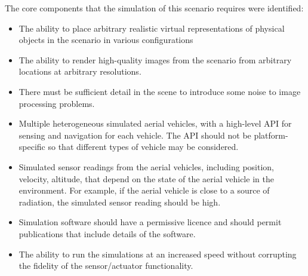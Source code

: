 The core components that the simulation of this scenario requires were identified: 
\begin{itemize}
    \item The ability to place arbitrary realistic virtual representations of physical objects in the scenario in various configurations
    \item The ability to render high-quality images from the scenario from arbitrary locations at arbitrary resolutions.
    \item There must be sufficient detail in the scene to introduce some noise to image processing problems.
    \item Multiple heterogeneous simulated aerial vehicles, with a high-level API for sensing and navigation for each vehicle. The API should not be platform-specific so that different types of vehicle may be considered.
    \item Simulated sensor readings from the aerial vehicles, including position, velocity, altitude, that depend on the state of the aerial vehicle in the environment. For example, if the aerial vehicle is close to a source of radiation, the simulated sensor reading should be high.
    \item Simulation software should have a permissive licence and should permit publications that include details of the software.
    \item The ability to run the simulations at an increased speed without corrupting the fidelity of the sensor/actuator functionality.
\end{itemize}

